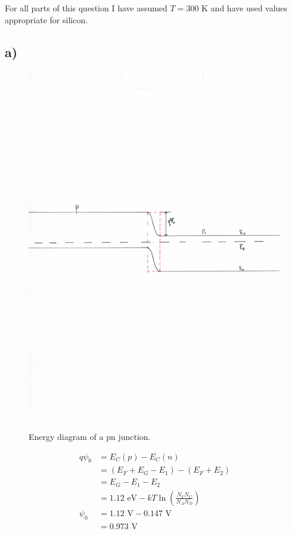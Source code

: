 For all parts of this question I have assumed $T = 300 \textrm{ K}$ and have used values appropriate for silicon.
\subsection*{a)}
	\begin{figure}[!htbp]
		\flushright
		\includegraphics[trim={3.5cm 12.5cm 2.5cm 11cm},clip]{./img/2a}
		\caption{Energy diagram of a pn junction.}
	\end{figure}
	\[
	\begin{aligned}
		q \psi_0 &= E_C(p) - E_C(n) \\
			   &= (E_F + E_G - E_1) - (E_F + E_2) \\
			   &= E_G - E_1 - E_2 \\
			   &= 1.12 \textrm{ eV} - k T \ln \left( \frac{N_V N_C}{N_A N_D} \right) \\
			\psi_0  &=	1.12 \textrm{ V} - 0.147 \textrm{ V} \\
			   &= 0.973 \textrm{ V}	   
	\end{aligned}
	\]
